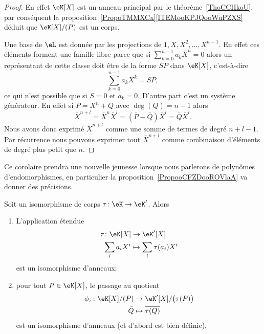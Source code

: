 \begin{proof}
	En effet \( \eK[X]\) est un anneau principal par le théorème~\ref{ThoCCHkoU}, par conséquent la proposition~\ref{PropoTMMXCx}\ref{ITEMooKPJQooWuPZXS} déduit que \( \eK[X]/(P)\) est un corps.

	Une base de \( \eL\) est donnée par les projections de \( 1,X,X^2,\ldots, X^{n-1}\). En effet ces éléments forment une famille libre parce que si \( \sum_{k=0}^{n-1}a_k\bar X^n=0\) alors un représentant de cette classe doit être de la forme \( SP\) dans \( \eK[X]\), c'est-à-dire
	\begin{equation}
		\sum_{k=0}^{n-1}a_kX^k=SP,
	\end{equation}
	ce qui n'est possible que si \( S=0\) et \( a_k=0\). D'autre part c'est un système générateur. En effet si \( P=X^n+Q\) avec \( \deg(Q)=n-1\) alors
	\begin{equation}
		\bar X^{n+l}=\bar X^n\bar X^l=(\bar P-\bar Q)\bar X^l=\bar Q\bar X^l.
	\end{equation}
	Nous avons donc exprimé \( \bar X^{n+l}\) comme une somme de termes de degré \( n+l-1\). Par récurrence nous pouvons exprimer tout \( \bar X^{n+l}\) comme combinaison d'éléments de degré plus petit que \( n\).
\end{proof}

\begin{normaltext}
	Ce corolaire prendra une nouvelle jeunesse lorsque nous parlerons de polynômes d'endomorphismes, en particulier la proposition~\ref{PropooCFZDooROVlaA} va donner des précisions.
\end{normaltext}

\begin{lemma}        \label{LEMooGRIMooPxCXAZ}
	Soit un isomorphisme de corps \( \tau\colon \eK\to \eK'\). Alors
	\begin{enumerate}
		\item
		      L'application étendue
		      \begin{equation}
			      \begin{aligned}
				      \tau\colon \eK[X] & \to \eK'[X]                \\
				      \sum_ia_iX^i      & \mapsto \sum_i\tau(a_i)X^i
			      \end{aligned}
		      \end{equation}
		      est un isomorphisme d'anneaux;
		\item
		      pour tout \( P\in \eK[X]\), le passage au quotient
		      \begin{equation}
			      \begin{aligned}
				      \phi_{\tau}\colon \eK[X]/(P) & \to \eK'[X]/\big( \tau(P) \big) \\
				      \bar Q                       & \mapsto \overline{ \tau(Q) }
			      \end{aligned}
		      \end{equation}
		      est un isomorphisme d'anneaux (et d'abord est bien définie).
	\end{enumerate}
\end{lemma}

